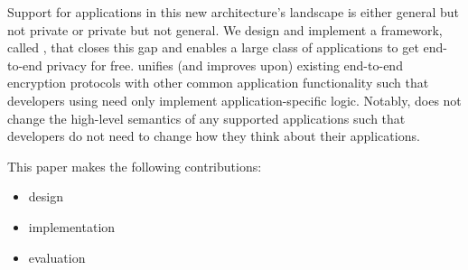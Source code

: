 Support for applications in this new architecture's landscape is either 
general but not private or private but not general. We design and implement
a framework, called \name, that closes this gap and enables a large class of
applications to get end-to-end privacy for free. \name unifies (and improves 
upon) existing end-to-end encryption protocols \cite{signal} with other common 
application functionality such that developers using \name need only implement 
application-specific logic. Notably, \name does not change the high-level 
semantics of any supported applications such that developers do not need to 
change how they think about their applications.

This paper makes the following contributions: 
\begin{itemize}
\item \name design
\item \name implementation
\item \name evaluation
\end{itemize}
